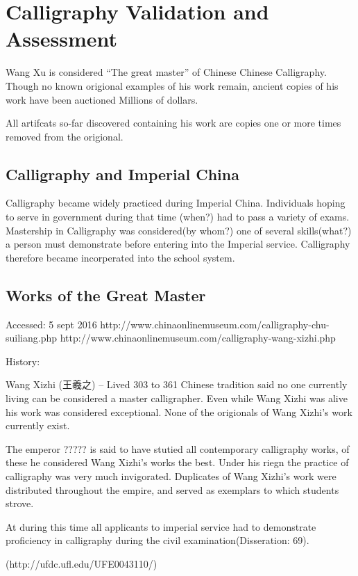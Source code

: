 \chapter{Calligraphy Validation and Assessment}

Wang Xu is considered ``The great master'' of Chinese Chinese Calligraphy.  Though no known origional examples of his work remain, ancient copies of his work have been auctioned Millions of dollars.

All artifcats so-far discovered containing his work are copies one or more times removed from the origional.

\section{Calligraphy and Imperial China}

Calligraphy became widely practiced during Imperial China.  Individuals hoping to serve in government during that time (when?) had to pass a variety of exams.  Mastership in Calligraphy was considered(by whom?) one of several skills(what?) a person must demonstrate before entering into the Imperial service.  Calligraphy therefore became incorperated into the school system. 

\section{Works of the Great Master}
Accessed:  5 sept 2016
http://www.chinaonlinemuseum.com/calligraphy-chu-suiliang.php 
http://www.chinaonlinemuseum.com/calligraphy-wang-xizhi.php

History:

Wang Xizhi (王羲之) -- Lived 303 to 361
Chinese tradition said no one currently living can be considered a master calligrapher.  Even while Wang Xizhi was alive his work was considered exceptional.  None of the origionals of Wang Xizhi's work currently exist.

The emperor ????? is said to have stutied all contemporary calligraphy works, of these he considered Wang Xizhi's works the best.  Under his riegn the practice of calligraphy was very much invigorated.  Duplicates of Wang Xizhi's work were distributed throughout the empire, and served as exemplars to which students strove.

At during this time all applicants to imperial service had to demonstrate proficiency in calligraphy during the civil examination(Disseration: 69).

(http://ufdc.ufl.edu/UFE0043110/)

